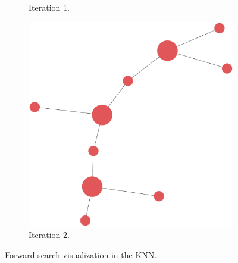 \documentclass[titlepage,11pt]{article}
\begin{document}
\begin{figure}
\begin{subfigure}[!htb]{0.32\textwidth}
		\caption{Iteration 1.}
	\end{subfigure}
	\begin{subfigure}[!htb]{0.32\textwidth}
		\centering
		\includegraphics[width=\columnwidth]{figures/knn_simple_forward_think_2.pdf}
		\caption{Iteration 2.}
	\end{subfigure}
	\caption{Forward search visualization in the KNN.}
	\label{fig:forward_search_test}
\end{figure}
\end{document}
